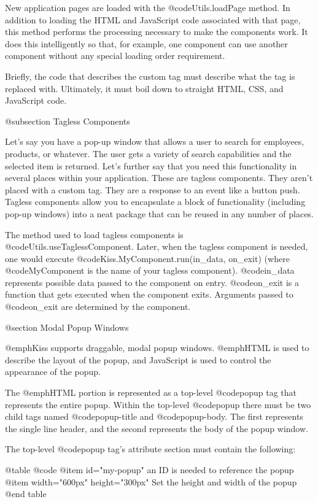 New application pages are loaded with the @code{Utils.loadPage}
method.  In addition to loading the HTML and JavaScript code
associated with that page, this method performs the processing
necessary to make the components work.  It does this intelligently so
that, for example, one component can use another component without any
special loading order requirement.

Briefly, the code that describes the custom tag must describe what the
tag is replaced with.  Ultimately, it must boil down to straight HTML,
CSS, and JavaScript code.


@subsection Tagless Components

Let's say you have a pop-up window that allows a user to search for employees, products, or whatever.
The user gets a variety of search capabilities and the selected item is returned. Let's further say
that you need this functionality in several places within your application.  These are tagless
components.  They aren't placed with a custom tag.  They are a response to an event like a button push.
Tagless components allow you to encapsulate a block of functionality (including pop-up windows) into
a neat package that can be reused in any number of places.

The method used to load tagless components is
@code{Utils.useTaglessComponent}.  Later, when the tagless component
is needed, one would execute @code{Kiss.MyComponent.run(in_data, on_exit)} (where
@code{MyComponent} is the name of your tagless component).  
@code{in_data} represents possible data passed to the component on entry.
@code{on_exit} is a function that gets executed when the component exits.
Arguments passed to @code{on_exit} are determined by the component.


@section Modal Popup Windows

@emph{Kiss} supports draggable, modal popup windows. @emph{HTML} is
used to describe the layout of the popup, and JavaScript is used to
control the appearance of the popup.

The @emph{HTML} portion is represented as a top-level @code{popup} tag
that represents the entire popup.  Within the top-level @code{popup}
there must be two child tags named @code{popup-title} and
@code{popup-body}.  The first represents the single line header, and
the second represents the body of the popup window.

The top-level @code{popup} tag's attribute section must contain the following:

@table @code
@item id="my-popup"
an ID is needed to reference the popup
@item width="600px" height="300px"
Set the height and width of the popup
@end table

